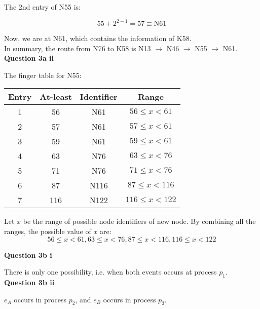 \documentclass[11pt,a4paper]{report}
\begin{document}
\begin{multicols*}{2}
\noindent The 2nd entry of N55 is:

$$55 + 2^{2-1} = 57 \equiv \text{N61}$$

\noindent Now, we are at N61, which contains the information of K58. \\

\noindent In summary, the route from N76 to K58 is N13 $\rightarrow$ N46 $\rightarrow$ N55 $\rightarrow$ N61.\\

\noindent \textbf{Question 3a ii}

\noindent The finger table for N55:

\begin{center}
\begin{tabular}{|c|c|c|c|}
  \hline
  Entry & At-least & Identifier & Range\\ \hline
  1     & 56       & N61        & $56\le x <61$\\
  2     & 57       & N61        & $57\le x <61$\\
  3     & 59       & N61        & $59\le x <61$\\
  4     & 63       & N76        & $63\le x <76$\\
  5     & 71       & N76        & $71\le x <76$\\
  6     & 87       & N116       & $87\le x <116$\\
  7     & 116      & N122       & $116\le x <122$\\ \hline
\end{tabular}
\end{center}

\noindent Let $x$ be the range of possible node identifiers of new node. By combining all the ranges, the possible value of $x$ are:
$$56\le x <61, 63\le x <76,87\le x <116,116\le x <122$$

\noindent \textbf{Question 3b i}

\noindent There is only one possibility, i.e. when both events occurs at process $p_1$. \\

\noindent \textbf{Question 3b ii}

\noindent $e_A$ occurs in process $p_2$, and $e_B$ occurs in process $p_3$.

\begin{center}
\end{center}
\end{multicols*}
\end{document}
